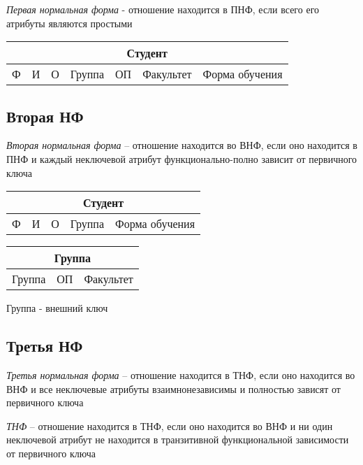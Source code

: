 \documentclass[12pt, a4paper]{article}
\begin{document}
\emph{Первая нормальная форма} - отношение находится в ПНФ, если всего его атрибуты являются простыми

\begin{center}
    \begin{tabular}{|c|c|c|c|c|c|c|}
         \hline \multicolumn{7}{|c|}{Студент}\\
         \hline Ф & И & О & Группа & ОП & Факультет & Форма обучения\\
         \hline
    \end{tabular}
\end{center}

\subsection{Вторая НФ}

\emph{Вторая нормальная форма} -- отношение находится во ВНФ, если оно находится в ПНФ и каждый неключевой атрибут функционально-полно зависит от первичного ключа

\begin{center}
    \begin{tabular}{|c|c|c|c|c|}
         \hline \multicolumn{5}{|c|}{Студент}\\
         \hline Ф & И & О & Группа & Форма обучения\\
         \hline
    \end{tabular}
    \begin{tabular}{|c|c|c|}
         \hline \multicolumn{3}{|c|}{Группа} \\
         \hline Группа & ОП & Факультет \\
         \hline
    \end{tabular}
\end{center}

Группа - внешний ключ

\subsection{Третья НФ}

\emph{Третья нормальная форма} -- отношение находится в ТНФ, если оно находится во ВНФ и все неключевые атрибуты взаимнонезависимы и полностью зависят от первичного ключа

\emph{ТНФ} -- отношение находится в ТНФ, если оно находится во ВНФ и ни один неключевой атрибут не находится в транзитивной функциональной зависимости от первичного ключа
\end{document}
